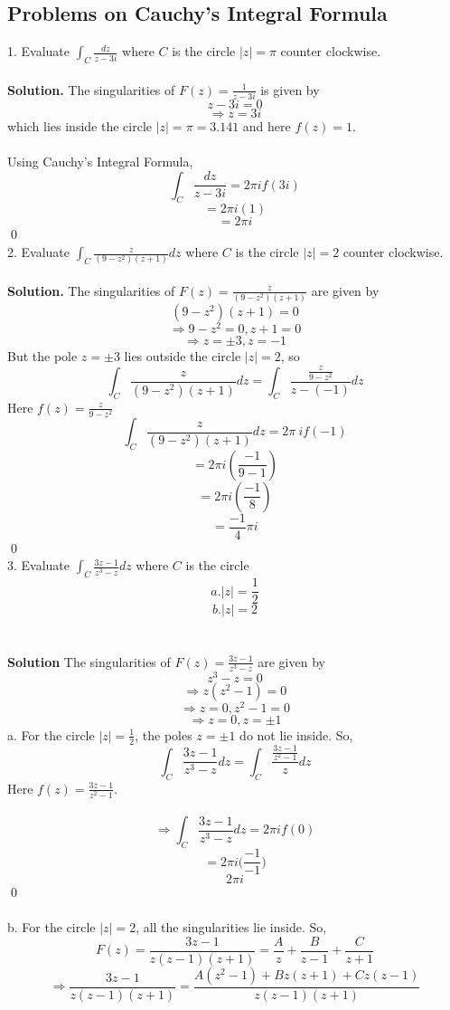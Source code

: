\documentclass{article}
\begin{document}
\subsection{Problems on Cauchy's Integral Formula}
1. Evaluate $\displaystyle\int_{C}\frac{dz}{z-3i}$ where $C$ is the circle $|z|=\pi$ counter clockwise.
\\
\\
\textbf{Solution.} The singularities of $F(z)=\frac{1}{z-3i}$ is given by
\[
z-3i=0
\]
\[
\Rightarrow z=3i
\]
which lies inside the circle $|z|=\pi=3.141$ and here $f(z)=1$.
\\
\\
Using Cauchy's Integral Formula,
\[
\displaystyle\int_{C}\frac{dz}{z-3i}=2\pi if(3i)
\]
\[
=2\pi i(1)
\]
\[
=2\pi i
\] 
\qed
\\
2. Evaluate $\displaystyle\int_{C}\frac{z}{(9-z^2)(z+1)}dz$ where $C$ is the circle $|z|=2$ counter clockwise.
\\
\\
\textbf{Solution.} The singularities of $F(z)=\frac{z}{(9-z^2)(z+1)}$ are given by
\[
(9-z^2)(z+1)=0
\]
\[
\Rightarrow 9-z^2=0, z+1=0
\]
\[
\Rightarrow z=\pm3,z=-1
\]
But the pole $z=\pm3$ lies outside the circle $|z|=2$, so
\[
\int_{C}\frac{z}{(9-z^2)(z+1)}dz=\int_{C}\frac{\frac{z}{9-z^2}}{z-(-1)}dz
\]
Here $f(z)=\frac{z}{9-z^2}$
\\
\[
\int_{C}\frac{z}{(9-z^2)(z+1)}dz=2\pi\ if(-1)
\]
\[
=2\pi i(\frac{-1}{9-1})
\]
\[
=2\pi i(\frac{-1}{8})
\]
\[
=\frac{-1}{4}\pi i
\]
\qed
\\
3. Evaluate $\displaystyle\int_{C}\frac{3z-1}{z^3-z}dz$ where $C$ is the circle
\[
a. |z|=\frac{1}{2}
\]
\[
b. |z|=2
\]
\\
\\
\textbf{Solution} The singularities of $F(z)=\frac{3z-1}{z^3-z}$ are given by
\[
z^3-z=0
\]
\[
\Rightarrow z(z^2-1)=0
\]
\[
\Rightarrow z=0, z^2-1=0
\]
\[
\Rightarrow z=0, z=\pm1
\]
a. For the circle $|z|=\frac{1}{2}$, the poles $z=\pm1$ do not lie inside. So,
\[
\int_{C}\frac{3z-1}{z^3-z}dz=\int_{C}\frac{\frac{3z-1}{z^2-1}}{z}dz
\]
Here $f(z)=\frac{3z-1}{z^2-1}$.
\\
\\
\[
\Rightarrow \int_{C}\frac{3z-1}{z^3-z}dz=2\pi if(0)
\]
\[
=2\pi i\Big(\frac{-1}{-1}\Big)
\]
\[
2\pi i
\]
\qed
\\
\\
b. For the circle $|z|=2$, all the singularities lie inside. So,
\[
F(z)=\frac{3z-1}{z(z-1)(z+1)}=\frac{A}{z}+\frac{B}{z-1}+\frac{C}{z+1}
\]
\[
\Rightarrow \frac{3z-1}{z(z-1)(z+1)}=\frac{A(z^2-1)+Bz(z+1)+Cz(z-1)}{z(z-1)(z+1)}
\]
\end{document}
